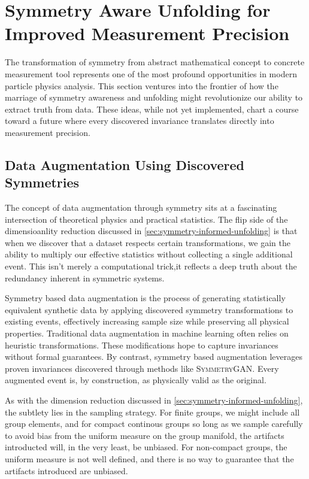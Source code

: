 \section{Symmetry Aware Unfolding for Improved Measurement Precision}
\label{sec:improved-measurement-prediction}
    The transformation of symmetry from abstract mathematical concept to concrete measurement tool represents one of the most profound opportunities in modern particle physics analysis.
    This section ventures into the frontier of how the marriage of symmetry awareness and unfolding might revolutionize our ability to extract truth from data.
    These ideas, while not yet implemented, chart a course toward a future where every discovered invariance translates directly into measurement precision.
    \subsection{Data Augmentation Using Discovered Symmetries}
        The concept of data augmentation through symmetry sits at a fascinating intersection of theoretical physics and practical statistics.
        The flip side of the dimensioanlity reduction discussed in \cref{sec:symmetry-informed-unfolding} is that when we discover that a dataset respects certain transformations, we gain the ability to multiply our effective statistics without collecting a single additional event.
        This isn't merely a computational trick,it reflects a deep truth about the redundancy inherent in symmetric systems.

        Symmetry based data augmentation is the process of generating statistically equivalent synthetic data by applying discovered symmetry transformations to existing events, effectively increasing sample size while preserving all physical properties.
        Traditional data augmentation in machine learning often relies on heuristic transformations.
        These modifications hope to capture invariances without formal guarantees.
        By contrast, symmetry based augmentation leverages proven invariances discovered through methods like \textsc{SymmetryGAN}.
        Every augmented event is, by construction, as physically valid as the original.

        As with the dimension reduction discussed in \cref{sec:symmetry-informed-unfolding}, the subtlety lies in the sampling strategy.
        For finite groups, we might include all group elements, and for compact continous groups so long as we sample carefully to avoid bias from the uniform measure on the group manifold, the artifacts introducted will, in the very least, be unbiased.
        For non-compact groups, the uniform measure is not well defined, and there is no way to guarantee that the artifacts introduced are unbiased.

